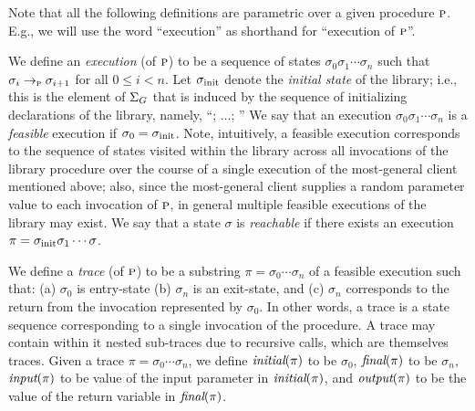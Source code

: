 Note that all the following definitions are parametric over a given procedure $\textsc{p}$.
E.g., we will use the word ``execution'' as shorthand for ``execution of $\textsc{p}$''.

We define an \emph{execution} (of $\textsc{p}$) to be a sequence of states $\sigma_0 \sigma_1 \cdots \sigma_n$ such that
$\sigma_i \rightarrow_{\textsc{p}} \sigma_{i+1}$ for all $0 \leq i < n$.
Let $\sigma_{\text{init}}$ denote the \emph{initial state} of the library; i.e., this
is the element of $\Sigma_G$ that is induced by the sequence of initializing declarations of
the library, namely, ``;
$\ldots$; ''
We say that an execution $\sigma_0 \sigma_1 \cdots \sigma_n$ is a
\emph{feasible} execution if $\sigma_0 = \sigma_{\text{init}}$. Note, 
intuitively, a feasible execution  corresponds to the sequence
of states visited within the library across all invocations of
the library procedure over the course of a single execution of
the most-general client mentioned above; also, since the most-general client
supplies a random parameter value to each invocation of $\textsc{p}$, in general
multiple feasible executions of the library may exist.
We say that a state $\sigma$ is \emph{ reachable} if there exists an execution $\pi = \sigma_{\text{init}} \sigma_1 \cdots \sigma$.


We define a \emph{trace} (of $\textsc{p}$) to be a substring 
 $\pi = \sigma_0 \cdots \sigma_n$ of a feasible execution such that:
 (a) $\sigma_0$ is entry-state
 (b) $\sigma_n$ is an exit-state, and
 (c) $\sigma_n$ corresponds to the return from the invocation represented
by $\sigma_0$.
In other words, a trace is a state sequence corresponding to a single
invocation of the procedure. A trace may contain within it nested
sub-traces due to recursive calls, which are themselves traces.
Given a trace $\pi = \sigma_0 \cdots \sigma_n$, we define
$\textit{initial}(\pi)$ to be $\sigma_0$,
$\textit{final}(\pi)$ to be $\sigma_n$,
$\textit{input}(\pi)$ to be value of the input parameter in $\textit{initial}(\pi)$,
and $\textit{output}(\pi)$ to be the value of the return variable in $\textit{final}(\pi)$.

